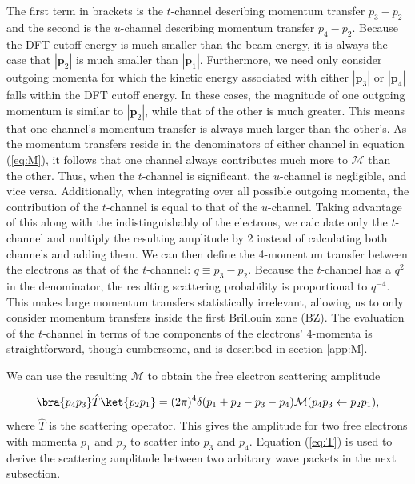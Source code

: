 \documentclass{article}
\begin{document}
The first term in brackets is the $t$-channel describing momentum transfer $p_3
- p_2$ and the second is the $u$-channel describing momentum transfer $p_4 -
p_2$.
Because the DFT cutoff energy is much smaller than the beam energy, it is
always the case that $|\mathbf{p}_2|$ is much smaller than $|\mathbf{p}_1|$.
Furthermore, we need only consider outgoing momenta for which the kinetic
energy associated with either $|\mathbf{p}_3|$ or $|\mathbf{p}_4|$ falls within
the DFT cutoff energy.
In these cases, the magnitude of one outgoing momentum is similar to
$|\mathbf{p}_2|$, while that of the other is much greater.
This means that one channel's momentum transfer is always much larger than the
other's.
As the momentum transfers reside in the denominators of either channel in
equation (\ref{eq:M}), it follows that one channel always contributes much more
to $\mathcal{M}$ than the other.
Thus, when the $t$-channel is significant, the $u$-channel is negligible, and
vice versa.
Additionally, when integrating over all possible outgoing momenta, the
contribution of the $t$-channel is equal to that of the $u$-channel.
Taking advantage of this along with the indistinguishably of the electrons, we
calculate only the $t$-channel and multiply the resulting amplitude by 2
instead of calculating both channels and adding them.
We can then define the 4-momentum transfer between the electrons as that of the
$t$-channel: $q\equiv p_3 - p_2$.
Because the $t$-channel has a $q^2$ in the denominator, the resulting
scattering probability is proportional to $q^{-4}$.
This makes large momentum transfers statistically irrelevant, allowing us to
only consider momentum transfers inside the first Brillouin zone (BZ).
The evaluation of the $t$-channel in terms of the
components of the electrons' 4-momenta is straightforward, though cumbersome,
and is described in section \ref{app:M}.

We can use the resulting $\mathcal{M}$ to obtain the free electron scattering
amplitude

\begin{equation} 
  \label{eq:T} 
  \bra{p_4 p_3}\hat{T}\ket{p_2p_1} 
  = 
  (2\pi)^4\delta(p_1 + p_2 - p_3 - p_4) 
  \mathcal{M}(p_4p_3\leftarrow p_2p_1),
\end{equation}
%
where $\hat{T}$ is the scattering operator.\cite{Peskin1995, Lancaster2014}
This gives the amplitude for two free electrons with momenta $p_1$ and $p_2$ to
scatter into $p_3$ and $p_4$.
Equation (\ref{eq:T}) is used to derive the scattering amplitude between two
arbitrary wave packets in the next subsection.
\end{document}
